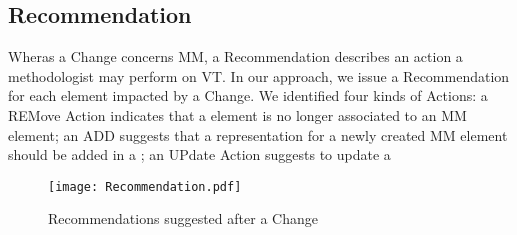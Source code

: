 \subsection{Recommendation}
\label{sec:Suggestion:Recommendation}

Wheras a \textsf{Change} concerns \textsf{MM}, a \textsf{Recommendation} describes
an action a methodologist may perform on \textsf{VT}. In our approach, we
issue a \textsf{Recommendation} for each \viewtype element impacted by a 
\textsf{Change}. We identified four kinds of \textsf{Action}s: a \textsf{REM}ove
\textsf{Action} indicates that a \viewtype element is no longer associated to an
\textsf{MM} element; an \textsf{ADD} suggests that a representation for a newly 
created \textsf{MM} element should be added in a \viewtype; an \textsf{UP}date
\textsf{Action} suggests to update a 


\begin{figure}[t]
    \centering
    \texttt{[image: Recommendation.pdf]}
    \caption{\textsf{Recommendation}s suggested after a \textsf{Change}}
    \label{fig:Recommendation}
\end{figure}